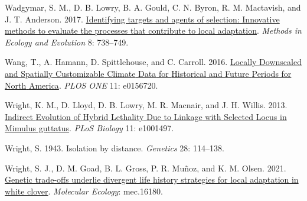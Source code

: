 \documentclass[
  12pt,
]{article}
\newlength{\cslhangindent}
\newlength{\cslentryspacingunit} %
\newenvironment{CSLReferences}[2] %
 {%
  \setlength{\parindent}{0pt}
  \ifodd #1
  \let\oldpar\par
  \def\par{\hangindent=\cslhangindent\oldpar}
  \fi
  \setlength{\parskip}{#2\cslentryspacingunit}
 }%
 {}
\begin{document}
\begin{CSLReferences}{1}{0}
\leavevmode{}%
Wadgymar, S. M., D. B. Lowry, B. A. Gould, C. N. Byron, R. M. Mactavish, and J. T. Anderson. 2017. \href{https://doi.org/10.1111/2041-210X.12777}{Identifying targets and agents of selection: Innovative methods to evaluate the processes that contribute to local adaptation}. \emph{Methods in Ecology and Evolution} 8: 738--749.

\leavevmode{}%
Wang, T., A. Hamann, D. Spittlehouse, and C. Carroll. 2016. \href{https://doi.org/10.1371/journal.pone.0156720}{Locally {Downscaled} and {Spatially} {Customizable} {Climate} {Data} for {Historical} and {Future} {Periods} for {North} {America}}. \emph{PLOS ONE} 11: e0156720.

\leavevmode{}%
Wright, K. M., D. Lloyd, D. B. Lowry, M. R. Macnair, and J. H. Willis. 2013. \href{https://doi.org/10.1371/journal.pbio.1001497}{Indirect {Evolution} of {Hybrid} {Lethality} {Due} to {Linkage} with {Selected} {Locus} in {Mimulus} guttatus}. \emph{PLoS Biology} 11: e1001497.

\leavevmode{}%
Wright, S. 1943. Isolation by distance. \emph{Genetics} 28: 114--138.

\leavevmode{}%
Wright, S. J., D. M. Goad, B. L. Gross, P. R. Muñoz, and K. M. Olsen. 2021. \href{https://doi.org/10.1111/mec.16180}{Genetic trade‐offs underlie divergent life history strategies for local adaptation in white clover}. \emph{Molecular Ecology}: mec.16180.

\end{CSLReferences}
\end{document}
